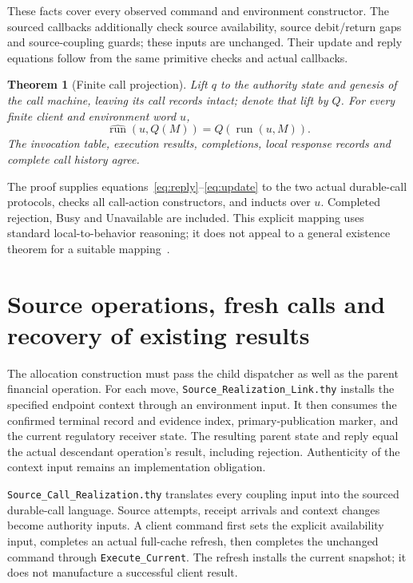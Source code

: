 \documentclass[10pt,a4paper]{article}
\newtheorem{theorem}{Theorem}
\newcommand{\code}[1]{\nolinkurl{#1}}
\newcommand{\source}[1]{\code{#1.thy}}
\begin{document}
These facts cover every observed command and environment constructor. The
sourced callbacks additionally check source availability, source debit/return
gaps and source-coupling guards; these inputs are unchanged. Their update and
reply equations follow from the same primitive checks and actual callbacks.

\begin{theorem}[Finite call projection]
Lift $q$ to the authority state and genesis of the call machine, leaving its
call records intact; denote that lift by $Q$. For every finite client and
environment word $u$,
\[
 \widehat{\operatorname{run}}(u,Q(M))
   =Q(\operatorname{run}(u,M)).
\]
The invocation table, execution results, completions, local response records
and complete call history agree.
\end{theorem}

The proof supplies equations~\eqref{eq:reply}--\eqref{eq:update} to the two
actual durable-call protocols, checks all call-action constructors, and
inducts over $u$. Completed rejection, Busy and Unavailable are included.
This explicit mapping uses standard local-to-behavior reasoning; it does not
appeal to a general existence theorem for a suitable mapping~\cite{abadiLamport1991}.

\clearpage
\section{Source operations, fresh calls and recovery of existing results}
The allocation construction must pass the child dispatcher as well as the
parent financial operation. For each move, \source{Source_Realization_Link}
installs the specified endpoint context through an environment input. It then
consumes the confirmed terminal record and evidence index, primary-publication
marker, and the current regulatory receiver state. The resulting parent state
and reply equal the actual descendant operation's result, including rejection.
Authenticity of the context input remains an implementation obligation.

\source{Source_Call_Realization} translates every coupling input into the
sourced durable-call language. Source attempts, receipt arrivals and context
changes become authority inputs. A client command first sets the explicit
availability input, completes an actual full-cache refresh, then completes
the unchanged command through \code{Execute_Current}. The refresh installs
the current snapshot; it does not manufacture a successful client result.
\end{document}

